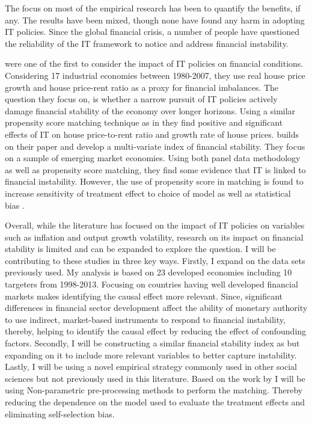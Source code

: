 \documentclass[12pt]{article}
\begin{document}
The focus on most of the empirical research has been to quantify the benefits, if any. The results have been mixed, though none have found any harm in adopting IT policies. Since the global financial crisis, a number of people have questioned the reliability of the IT framework to notice and address financial instability. 

\cite{RN34} were one of the first to consider the impact of IT policies on financial conditions. Considering 17 industrial economies between 1980-2007,  they use real house price growth and house price-rent ratio as a proxy for financial imbalances.  The question they focus on, is whether a narrow pursuit of IT policies actively damage financial stability of the economy over longer horizons. Using a similar propensity score matching technique as in \cite{RN13} they find positive and significant effects of IT on house price-to-rent ratio and growth rate of house prices. \cite{RN4} builds on their paper and develop a multi-variate index of financial stability. They focus on a sample of emerging market economies. Using both panel data methodology as well as propensity score matching, they find some evidence that IT is linked to financial instability. However, the use of propensity score in matching is found to increase sensitivity of treatment effect to choice of model as well as statistical bias \citep{RN26}.

Overall, while the literature has focused on the impact of IT policies on variables such as inflation and output growth volatility,  research on its impact on financial stability is limited and can be expanded to explore the question.  I will be contributing to these studies in three key ways. Firstly,  I expand on the data sets previously used. My analysis is based on 23 developed economies including 10 targeters from 1998-2013.  Focusing on countries having well developed financial markets makes identifying the causal effect more relevant. Since, significant differences in financial sector development affect the ability of monetary authority to use indirect, market-based instruments to respond to financial instability, thereby, helping to identify the causal effect by reducing the effect of confounding factors.
Secondly, I will be constructing a similar financial stability index as \cite{RN4} but expanding on it to include more relevant variables to better capture instability.
Lastly, I will be using a novel empirical strategy commonly used in other social sciences but not previously used in this literature.  Based on the work by \cite{RN29} I will be using Non-parametric pre-processing methods to perform the matching. Thereby reducing the dependence on the model used to evaluate the treatment effects and eliminating self-selection bias.
\end{document}
